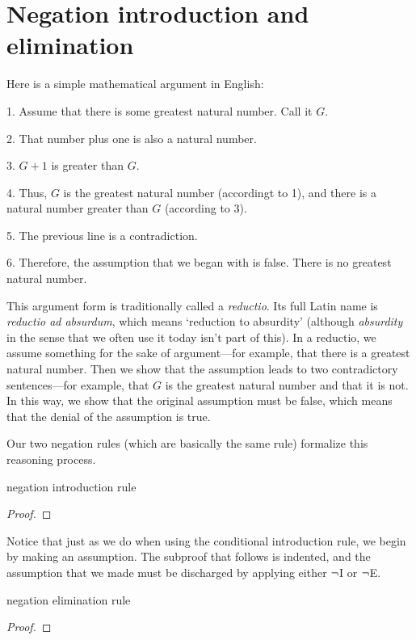 \section{Negation introduction and elimination}
Here is a simple mathematical argument in English:
\begin{earg}
\item[1.] Assume that there is some greatest natural number. Call it $G$.
\item[2.] That number plus one is also a natural number.
\item[3.] $G+1$ is greater than $G$.
\item[4.] Thus, $G$ is the greatest natural number (accordingt to 1), and there is a natural number greater than $G$ (according to 3).
\item[5.] The previous line is a contradiction.
\item[6.] Therefore, the assumption that we began with is false. There is no greatest natural number.
\end{earg}
This argument form is traditionally called a \emph{reductio}. Its full Latin name is \emph{reductio ad absurdum}, which means `reduction to absurdity' (although \textit{absurdity} in the sense that we often use it today isn't part of this). In a reductio, we assume something for the sake of argument---for example, that there is a greatest natural number. Then we show that the assumption leads to two contradictory sentences---for example, that $G$ is the greatest natural number and that it is not. In this way, we show that the original assumption must be false, which means that the denial of the assumption is true. 

Our two negation rules (which are basically the same rule) formalize this reasoning process.

\begin{factboxy}{negation introduction rule}
\begin{proof}
\open
	\as{}
\close
{}
\end{proof}
\end{factboxy}

\noindent Notice that just as we do when using the conditional introduction rule, we begin by making an assumption. The subproof that follows is indented, and the assumption that we made must be discharged by applying either ${\neg}$I or ${\neg}$E.

\begin{factboxy}{negation elimination rule}
\begin{proof}
\open
	\as{}
\close
{}
\end{proof}
\end{factboxy}

